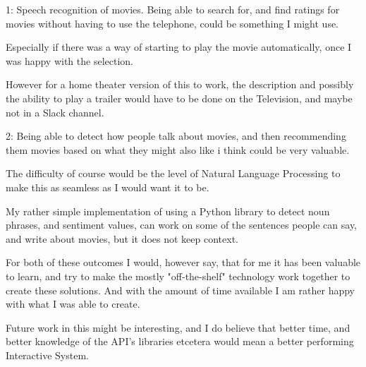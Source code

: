 \documentclass[11pt,fleqn]{book} %
\begin{document}
1:
Speech recognition of movies. Being able to search for, and find ratings for movies without having to use the telephone, could be something I might use.

Especially if there was a way of starting to play the movie automatically, once I was happy with the selection.

However for a home theater version of this to work, the description and possibly the ability to play a trailer would have to be done on the Television, and maybe not in a Slack channel.

2:
Being able to detect how people talk about movies, and then recommending them movies based on what they might also like i think could be very valuable.

The difficulty of course would be the level of Natural Language Processing to make this as seamless as I would want it to be.

My rather simple implementation of using a Python library to detect noun phrases, and sentiment values, can work on some of the sentences people can say, and write about movies, but it does not keep context.

For both of these outcomes I would, however say, that for me it has been valuable to learn, and try to make the mostly "off-the-shelf" technology work together to create these solutions. And with the amount of time available I am rather happy with what I was able to create.

Future work in this might be interesting, and I do believe that better time, and better knowledge of the API's libraries etcetera would mean a better performing Interactive System.


\vfill
\end{document}

